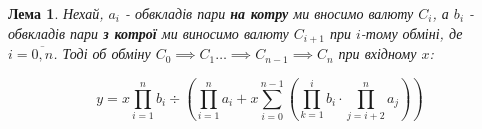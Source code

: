 \documentclass[a4paper, 11pt]{article}
\newcommand{\tqs}{\textquotesingle}
\newtheorem{lemma}{Лема}
\begin{document}
\begin{lemma} Нехай, \(a_i\) - об вкладів пари \textbf{на котру} ми вносимо
валюту \(C_i\), а \(b_i\) - об вкладів пари \textbf{з котрої} ми виносимо валюту
\(C_{i+1}\) при \(i\)-тому обміні, де \(i = \overline{0, n}\). Тоді об
обміну \(C_{0} \implies C_{1} \ldots \implies C_{n-1} \implies C_{n} \) при
вхідному \(x\):

\begin{equation}\label{eq:nth-swap}
y = x \prod_{i=1}^n b_i \div \left( \prod_{i=1}^{n} a_i + x \sum_{i=0}^{n-1} \left( \prod_{k=1}^i b_i \cdot \prod_{j=i+2}^{n}  a_j \right) \right)
\end{equation}
\end{lemma}

%
%
%
%
%
%
%
%
\end{document}
